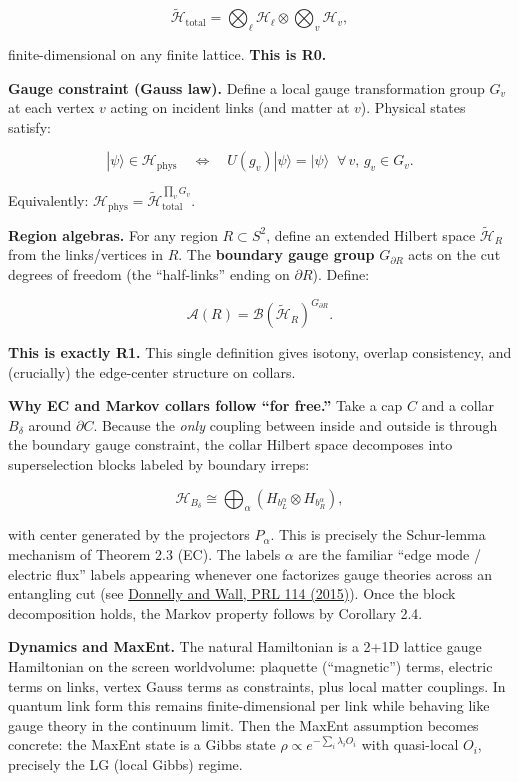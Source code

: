 \documentclass[
]{article}
\begin{document}
\[
\tilde{\mathcal{H}}_{\mathrm{total}} = \bigotimes_\ell \mathcal{H}_\ell \otimes \bigotimes_v \mathcal{H}_v,
\]

finite-dimensional on any finite lattice. \textbf{This is R0.}

\textbf{Gauge constraint (Gauss law).} Define a local gauge
transformation group \(G_v\) at each vertex \(v\) acting on incident
links (and matter at \(v\)). Physical states satisfy:

\[
|\psi\rangle \in \mathcal{H}_{\mathrm{phys}} \quad\Longleftrightarrow\quad U(g_v)|\psi\rangle = |\psi\rangle \;\;\forall\, v,\, g_v \in G_v.
\]

Equivalently:
\(\mathcal{H}_{\mathrm{phys}} = \tilde{\mathcal{H}}_{\mathrm{total}}^{\prod_v G_v}\).

\textbf{Region algebras.} For any region \(R \subset S^2\), define an
extended Hilbert space \(\tilde{\mathcal{H}}_R\) from the links/vertices
in \(R\). The \textbf{boundary gauge group} \(G_{\partial R}\) acts on
the cut degrees of freedom (the ``half-links'' ending on
\(\partial R\)). Define:

\[
\mathcal{A}(R) = \mathcal{B}(\tilde{\mathcal{H}}_R)^{G_{\partial R}}.
\]

\textbf{This is exactly R1.} This single definition gives isotony,
overlap consistency, and (crucially) the edge-center structure on
collars.

\textbf{Why EC and Markov collars follow ``for free.''} Take a cap \(C\)
and a collar \(B_\delta\) around \(\partial C\). Because the \emph{only}
coupling between inside and outside is through the boundary gauge
constraint, the collar Hilbert space decomposes into superselection
blocks labeled by boundary irreps:

\[
\mathcal{H}_{B_\delta} \cong \bigoplus_\alpha (H_{b_L^\alpha} \otimes H_{b_R^\alpha}),
\]

with center generated by the projectors \(P_\alpha\). This is precisely
the Schur-lemma mechanism of Theorem 2.3 (EC). The labels \(\alpha\) are
the familiar ``edge mode / electric flux'' labels appearing whenever one
factorizes gauge theories across an entangling cut (see
\href{https://link.aps.org/doi/10.1103/PhysRevLett.114.111603}{Donnelly
and Wall, PRL 114 (2015)}). Once the block decomposition holds, the
Markov property follows by Corollary 2.4.

\textbf{Dynamics and MaxEnt.} The natural Hamiltonian is a 2+1D lattice
gauge Hamiltonian on the screen worldvolume: plaquette (``magnetic'')
terms, electric terms on links, vertex Gauss terms as constraints, plus
local matter couplings. In quantum link form this remains
finite-dimensional per link while behaving like gauge theory in the
continuum limit. Then the MaxEnt assumption becomes concrete: the MaxEnt
state is a Gibbs state \(\rho \propto e^{-\sum_i \lambda_i O_i}\) with
quasi-local \(O_i\), precisely the LG (local Gibbs) regime.
\end{document}
